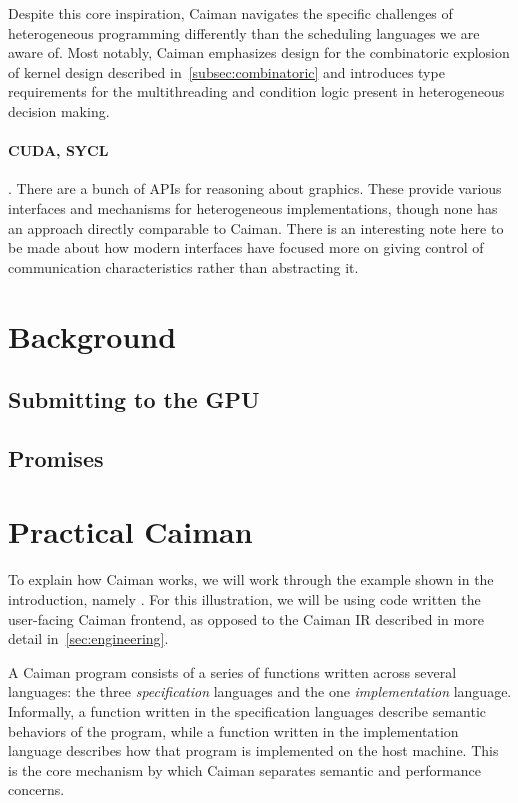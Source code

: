 Despite this core inspiration, Caiman navigates the specific challenges of heterogeneous programming differently than the scheduling languages we are aware of.   Most notably, Caiman emphasizes design for the combinatoric explosion of kernel design described in~\ref{subsec:combinatoric} and introduces type requirements for the multithreading and condition logic present in heterogeneous decision making.

\paragraph{CUDA, SYCL}

.  There are a bunch of APIs for reasoning about graphics.  These provide various interfaces and mechanisms for heterogeneous implementations, though none has an approach directly comparable to Caiman.  There is an interesting note here to be made about how modern interfaces have focused more on giving control of communication characteristics rather than abstracting it.

\section{Background}
\label{sec:background}

\subsection{Submitting to the GPU}
\label{subsec:submission}

\subsection{Promises}
\label{subsec:promise}

\section{Practical Caiman}
\label{sec:practical}

To explain how Caiman works, we will work through the example shown in the introduction, namely .  For this illustration, we will be using code written the user-facing Caiman frontend, as opposed to the Caiman IR described in more detail in~\ref{sec:engineering}.

A Caiman program consists of a series of functions written across several languages: the three \textit{specification} languages and the one \textit{implementation} language.  Informally, a function written in the specification languages describe semantic behaviors of the program, while a function written in the implementation language describes how that program is implemented on the host machine.  This is the core mechanism by which Caiman separates semantic and performance concerns.

